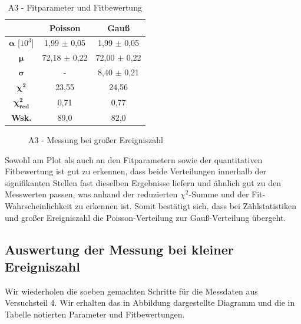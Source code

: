 \documentclass{article}
\begin{document}
\phantom{.}

\begin{table}[!h]
    \centering
    \begin{tabular}{ccc}
        \hline
         & \textbf{Poisson} & \textbf{Gauß} \\ \hline
        $\bm{\alpha}$ [$10^{3}$] & 1,99 $\pm$ 0,05 & 1,99 $\pm$ 0,05 \\
        $\bm{\mu}$ & 72,18 $\pm$ 0,22 & 72,00 $\pm$ 0,22 \\
        $\bm{\sigma}$ & - & 8,40 $\pm$ 0,21 \\ \hline
        $\bm{\chi^2}$ & 23,55 & 24,56 \\
        $\bm{\chi^2_{red}}$ & 0,71 & 0,77 \\
        \textbf{Wsk.} & 89,0 & 82,0 \\ \hline
    \end{tabular}%
    \caption{A3 - Fitparameter und Fitbewertung}
    \label{tab:A3-Fits}
\end{table}

\phantom{.}

\begin{figure}[!b]
    \centering
    \caption{A3 - Messung bei großer Ereigniszahl}
    \label{fig:A3-Ngroß}
\end{figure}

Sowohl am Plot als auch an den Fitparametern sowie der quantitativen Fitbewertung ist gut zu erkennen, dass beide Verteilungen innerhalb der signifikanten Stellen fast dieselben Ergebnisse liefern und ähnlich gut zu den Messwerten passen, was anhand der reduzierten $\chi^2$-Summe und der Fit-Wahrscheinlichkeit zu erkennen ist. Somit bestätigt sich, dass bei Zählstatistiken und großer Ereigniszahl die Poisson-Verteilung zur Gauß-Verteilung übergeht.

\subsection{Auswertung der Messung bei kleiner Ereigniszahl}

Wir wiederholen die soeben gemachten Schritte für die Messdaten aus Versuchsteil 4. Wir erhalten das in Abbildung dargestellte Diagramm und die in Tabelle notierten Parameter und Fitbewertungen.

\phantom{.}
\end{document}
